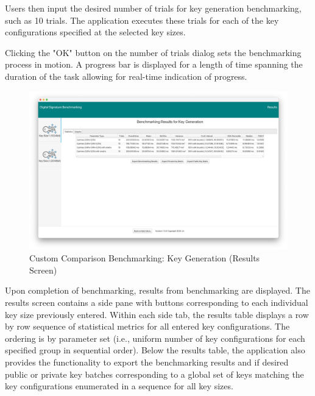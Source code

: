 \documentclass[]{final_report}
\begin{document}
Users then input the desired number of trials for key generation benchmarking, such as 10 trials. The application executes these trials for each of the key configurations specified at the selected key sizes.

Clicking the "OK" button on the number of trials dialog sets the benchmarking process in motion. A progress bar is displayed for a length of time spanning the duration of the task allowing for real-time indication of progress.


\begin{figure}[H]
    \centering
    \includegraphics[scale= 0.325]{main_pictures/ui/custom7.png}
   \caption{Custom Comparison Benchmarking: Key Generation (Results Screen)}
\end{figure}
Upon completion of benchmarking, results from benchmarking are displayed. The results screen contains a side pane with buttons corresponding to each individual key size previously entered. Within each side tab, the results table displays a row by row sequence of statistical metrics for all entered key configurations.  The ordering is by parameter set (i.e., uniform number of key  configurations for each specified group in sequential order). Below the results table, the application also provides the functionality to export the benchmarking results and if desired public or private key batches corresponding to a global set of keys matching the key configurations enumerated in a sequence for all key sizes.
\end{document}
